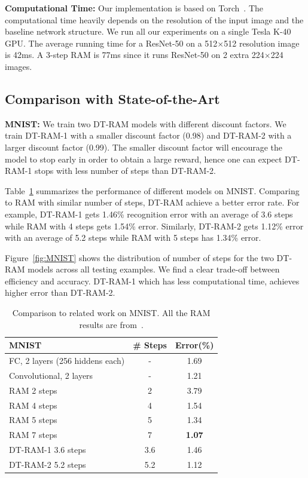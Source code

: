 \documentclass[10pt,twocolumn,letterpaper]{article}
\begin{document}
{\bf Computational Time:} Our implementation is based on Torch~\cite{collobert2011torch7}.
The computational time heavily depends on the resolution of the input image and the baseline network structure.
We run all our experiments on a single Tesla K-40 GPU.
The average running time for a ResNet-50 on a 512$\times$512 resolution image is 42ms. A 3-step RAM is 77ms since it runs ResNet-50 on 2 extra 224$\times$224 images.

\subsection{Comparison with State-of-the-Art}

{\bf MNIST:}  We train two DT-RAM models with different discount factors. We train DT-RAM-1 with a smaller discount factor (0.98) and DT-RAM-2 with a larger discount factor (0.99). The smaller discount factor will encourage the model to stop early in order to obtain a large reward, hence one can expect DT-RAM-1 stops with less number of steps than DT-RAM-2.

Table~\ref{tab:mnist} summarizes the performance of different models on MNIST.
Comparing to RAM with similar number of steps, DT-RAM achieve a better error rate.
For example, DT-RAM-1 gets 1.46\% recognition error with an average of 3.6 steps while RAM with 4 steps gets 1.54\% error.
Similarly, DT-RAM-2 gets 1.12\% error with an average of 5.2 steps while RAM with 5 steps has 1.34\% error.

Figure~\ref{fig:MNIST} shows the distribution of number of steps for the two DT-RAM models across all testing examples.
We find a clear trade-off between efficiency and accuracy. DT-RAM-1 which has less computational time, achieves higher error than DT-RAM-2.

\begin{table}
  \centering
  \addtolength{\tabcolsep}{2.5pt}
    \begin{tabular}{l c c}
      \toprule[0.2 em]
      {\bf MNIST} & \# Steps & Error(\%)  \\
      \toprule[0.2 em]
      \midrule
      FC, 2 layers (256 hiddens each) & - & 1.69 \\
      Convolutional, 2 layers & - & 1.21 \\
      RAM 2 steps & 2 & 3.79 \\
      RAM 4 steps & 4 & 1.54 \\
      RAM 5 steps & 5 & 1.34 \\
      RAM 7 steps & 7 & {\bf 1.07} \\
      \midrule
      DT-RAM-1 3.6 steps & 3.6 & 1.46 \\
      DT-RAM-2 5.2 steps & 5.2 & 1.12 \\
      \bottomrule[0.1 em]
    \end{tabular}
    \vspace{1pt}
    \caption{Comparison to related work on MNIST. All the RAM results are from~\cite{mnih2014recurrent}. }
    \label{tab:mnist}
\end{table}
\end{document}
